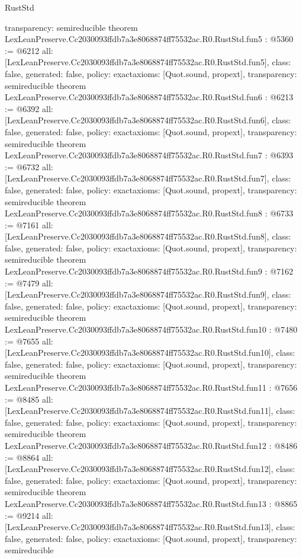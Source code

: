 \begin{lexlean}{RustStd}
\begin{coremodule}
{  transparency: semireducible
}
theorem LexLeanPreserve.Cc2030093ffdb7a3e8068874ff75532ac.R0.RustStd.fun5 : @5360 := @6212 {
  all: [LexLeanPreserve.Cc2030093ffdb7a3e8068874ff75532ac.R0.RustStd.fun5],
  class: false,
  generated: false,
  policy: exact{axioms: [Quot.sound, propext]},
  transparency: semireducible
}
theorem LexLeanPreserve.Cc2030093ffdb7a3e8068874ff75532ac.R0.RustStd.fun6 : @6213 := @6392 {
  all: [LexLeanPreserve.Cc2030093ffdb7a3e8068874ff75532ac.R0.RustStd.fun6],
  class: false,
  generated: false,
  policy: exact{axioms: [Quot.sound, propext]},
  transparency: semireducible
}
theorem LexLeanPreserve.Cc2030093ffdb7a3e8068874ff75532ac.R0.RustStd.fun7 : @6393 := @6732 {
  all: [LexLeanPreserve.Cc2030093ffdb7a3e8068874ff75532ac.R0.RustStd.fun7],
  class: false,
  generated: false,
  policy: exact{axioms: [Quot.sound, propext]},
  transparency: semireducible
}
theorem LexLeanPreserve.Cc2030093ffdb7a3e8068874ff75532ac.R0.RustStd.fun8 : @6733 := @7161 {
  all: [LexLeanPreserve.Cc2030093ffdb7a3e8068874ff75532ac.R0.RustStd.fun8],
  class: false,
  generated: false,
  policy: exact{axioms: [Quot.sound, propext]},
  transparency: semireducible
}
theorem LexLeanPreserve.Cc2030093ffdb7a3e8068874ff75532ac.R0.RustStd.fun9 : @7162 := @7479 {
  all: [LexLeanPreserve.Cc2030093ffdb7a3e8068874ff75532ac.R0.RustStd.fun9],
  class: false,
  generated: false,
  policy: exact{axioms: [Quot.sound, propext]},
  transparency: semireducible
}
theorem LexLeanPreserve.Cc2030093ffdb7a3e8068874ff75532ac.R0.RustStd.fun10 : @7480 := @7655 {
  all: [LexLeanPreserve.Cc2030093ffdb7a3e8068874ff75532ac.R0.RustStd.fun10],
  class: false,
  generated: false,
  policy: exact{axioms: [Quot.sound, propext]},
  transparency: semireducible
}
theorem LexLeanPreserve.Cc2030093ffdb7a3e8068874ff75532ac.R0.RustStd.fun11 : @7656 := @8485 {
  all: [LexLeanPreserve.Cc2030093ffdb7a3e8068874ff75532ac.R0.RustStd.fun11],
  class: false,
  generated: false,
  policy: exact{axioms: [Quot.sound, propext]},
  transparency: semireducible
}
theorem LexLeanPreserve.Cc2030093ffdb7a3e8068874ff75532ac.R0.RustStd.fun12 : @8486 := @8864 {
  all: [LexLeanPreserve.Cc2030093ffdb7a3e8068874ff75532ac.R0.RustStd.fun12],
  class: false,
  generated: false,
  policy: exact{axioms: [Quot.sound, propext]},
  transparency: semireducible
}
theorem LexLeanPreserve.Cc2030093ffdb7a3e8068874ff75532ac.R0.RustStd.fun13 : @8865 := @9214 {
  all: [LexLeanPreserve.Cc2030093ffdb7a3e8068874ff75532ac.R0.RustStd.fun13],
  class: false,
  generated: false,
  policy: exact{axioms: [Quot.sound, propext]},
  transparency: semireducible
}
\end{coremodule}
\end{lexlean}

